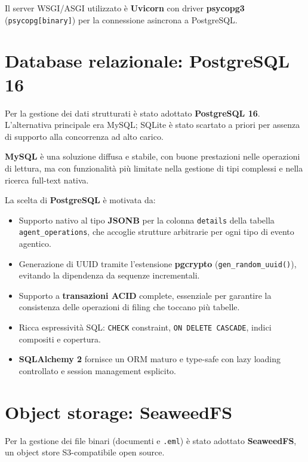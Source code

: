 Il server WSGI/ASGI utilizzato \`e \textbf{Uvicorn} con driver \textbf{psycopg3}
(\texttt{psycopg[binary]}) per la connessione asincrona a PostgreSQL.

\section{Database relazionale: PostgreSQL 16}
\label{sec:stack_db}

Per la gestione dei dati strutturati \`e stato adottato \textbf{PostgreSQL 16}.
L'alternativa principale era MySQL; SQLite \`e stato scartato a priori per assenza
di supporto alla concorrenza ad alto carico.

\textbf{MySQL} \`e una soluzione diffusa e stabile, con buone prestazioni nelle operazioni
di lettura, ma con funzionalit\`a pi\`u limitate nella gestione di tipi complessi e nella
ricerca full-text nativa.

La scelta di \textbf{PostgreSQL} \`e motivata da:
\begin{itemize}[leftmargin=*]
    \item Supporto nativo al tipo \textbf{JSONB} per la colonna \texttt{details} della
          tabella \texttt{agent\_operations}, che accoglie strutture arbitrarie per ogni
          tipo di evento agentico.
    \item Generazione di UUID tramite l'estensione \textbf{pgcrypto}
          (\texttt{gen\_random\_uuid()}), evitando la dipendenza da sequenze incrementali.
    \item Supporto a \textbf{transazioni ACID} complete, essenziale per garantire la
          consistenza delle operazioni di filing che toccano pi\`u tabelle.
    \item Ricca espressivit\`a SQL: \texttt{CHECK} constraint, \texttt{ON DELETE CASCADE},
          indici compositi e copertura.
    \item \textbf{SQLAlchemy 2} fornisce un ORM maturo e type-safe con lazy loading
          controllato e session management esplicito.
\end{itemize}

\section{Object storage: SeaweedFS}
\label{sec:stack_s3}

Per la gestione dei file binari (documenti e \texttt{.eml}) \`e stato adottato
\textbf{SeaweedFS}, un object store S3-compatibile open source.

